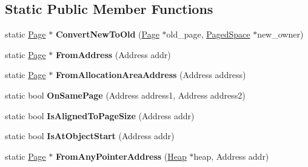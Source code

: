 \subsection*{Static Public Member Functions}
\begin{DoxyCompactItemize}
\item 
static \hyperlink{classv8_1_1internal_1_1_page}{Page} $\ast$ {\bfseries Convert\+New\+To\+Old} (\hyperlink{classv8_1_1internal_1_1_page}{Page} $\ast$old\+\_\+page, \hyperlink{classv8_1_1internal_1_1_paged_space}{Paged\+Space} $\ast$new\+\_\+owner)\hypertarget{classv8_1_1internal_1_1_page_ab39fb39609b0b3e92e7601bf9c829a0d}{}\label{classv8_1_1internal_1_1_page_ab39fb39609b0b3e92e7601bf9c829a0d}

\item 
static \hyperlink{classv8_1_1internal_1_1_page}{Page} $\ast$ {\bfseries From\+Address} (Address addr)\hypertarget{classv8_1_1internal_1_1_page_a00f1ce51248001f26fa8f18694791f63}{}\label{classv8_1_1internal_1_1_page_a00f1ce51248001f26fa8f18694791f63}

\item 
static \hyperlink{classv8_1_1internal_1_1_page}{Page} $\ast$ {\bfseries From\+Allocation\+Area\+Address} (Address address)\hypertarget{classv8_1_1internal_1_1_page_a4c49ccb859e100d03aaa86de9cd40528}{}\label{classv8_1_1internal_1_1_page_a4c49ccb859e100d03aaa86de9cd40528}

\item 
static bool {\bfseries On\+Same\+Page} (Address address1, Address address2)\hypertarget{classv8_1_1internal_1_1_page_a4c6bff09f59d482e543a7c4dae8a7ca7}{}\label{classv8_1_1internal_1_1_page_a4c6bff09f59d482e543a7c4dae8a7ca7}

\item 
static bool {\bfseries Is\+Aligned\+To\+Page\+Size} (Address addr)\hypertarget{classv8_1_1internal_1_1_page_ab095f8202bcc6f6936603aa681eae2a4}{}\label{classv8_1_1internal_1_1_page_ab095f8202bcc6f6936603aa681eae2a4}

\item 
static bool {\bfseries Is\+At\+Object\+Start} (Address addr)\hypertarget{classv8_1_1internal_1_1_page_ada3c5d1cc2d717c76b0fe16f025e00d8}{}\label{classv8_1_1internal_1_1_page_ada3c5d1cc2d717c76b0fe16f025e00d8}

\item 
static \hyperlink{classv8_1_1internal_1_1_page}{Page} $\ast$ {\bfseries From\+Any\+Pointer\+Address} (\hyperlink{classv8_1_1internal_1_1_heap}{Heap} $\ast$heap, Address addr)\hypertarget{classv8_1_1internal_1_1_page_afa19bde696fb172fc3c85b9f5a680a13}{}\label{classv8_1_1internal_1_1_page_afa19bde696fb172fc3c85b9f5a680a13}

\end{DoxyCompactItemize}
